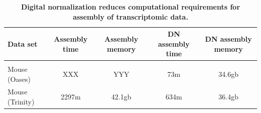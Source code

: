 \documentclass[10pt]{article}
\begin{document}

\begin{table}[!ht]
\caption{
\bf{Digital normalization reduces computational requirements for assembly of transcriptomic data.}}

\begin{tabular}{|l|c|c|c|c|}

Data set & Assembly time & Assembly memory & DN assembly time & DN assembly memory \\
\hline \\
Mouse (Oases) & XXX & YYY & 73m & 34.6gb \\
Mouse (Trinity) & 2297m & 42.1gb & 634m & 36.4gb \\

\end{tabular}

\begin{flushleft}
\end{flushleft}
\label{tab:dntrans}
\end{table}
\end{document}
